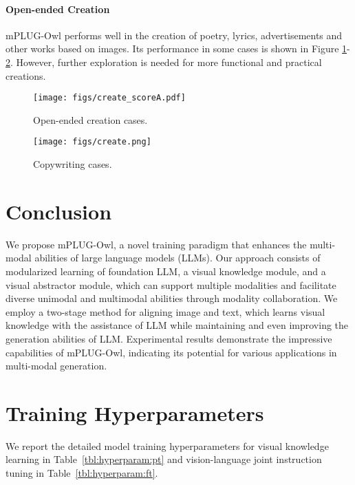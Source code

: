 \documentclass{article}
\newcommand{\modelname}{mPLUG-Owl\xspace}
\begin{document}
\paragraph{Open-ended Creation}
mPLUG-Owl performs well in the creation of poetry, lyrics, advertisements and other works based on images. Its performance in some cases is shown in Figure \ref{fig:create_scoreA}-\ref{fig:copywriting}. However, further exploration is needed for more functional and practical creations.
\begin{figure}[!ht]
    \centering
    \texttt{[image: figs/create\_scoreA.pdf]}
    \caption{Open-ended creation cases.}
    \label{fig:create_scoreA}
    \vspace{-2mm}
\end{figure}

\begin{figure}[!ht]
    \centering
    \texttt{[image: figs/create.png]}
    \caption{Copywriting cases.}
    \label{fig:copywriting}
    \vspace{-2mm}
\end{figure}



\section{Conclusion}
We propose \modelname, a novel training paradigm that enhances the multi-modal abilities of large language models (LLMs). Our approach consists of modularized learning of foundation LLM, a visual knowledge module, and a visual abstractor module, which can support multiple modalities and facilitate diverse unimodal and multimodal abilities through modality collaboration. We employ a two-stage method for aligning image and text, which learns visual knowledge with the assistance of LLM while maintaining and even improving the generation abilities of LLM. Experimental results demonstrate the impressive capabilities of \modelname, indicating its potential for various applications in multi-modal generation.


\clearpage




\clearpage
\newpage
\appendix
\section{Training Hyperparameters}
We report the detailed model training hyperparameters for visual knowledge learning in Table~\ref{tbl:hyperparam:pt} and vision-language joint instruction tuning in Table~\ref{tbl:hyperparam:ft}.
\end{document}
